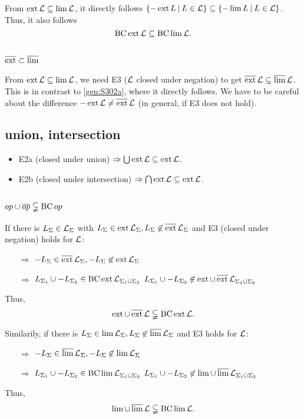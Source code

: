 From $\operatorname{ext} \mathcal{L} \subseteq \lim \mathcal{L}$, it directly follows $\Set{-\ext L}{L \in \Lang} \subseteq \Set{-\lim L}{L \in \Lang}$. Thus, it also follows
\[ \operatorname{BC} \operatorname{ext} \mathcal{L} \subseteq \operatorname{BC} \lim \mathcal{L} . \]

\subsection{$\operatorname{\overline{ext}} \subset \operatorname{\overline{lim}}$}

From $\operatorname{ext} \mathcal{L} \subseteq \lim \mathcal{L}$, we need E3 ($\mathcal{L}$ closed under negation) to get $\operatorname{\overline{ext}} \mathcal{L} \subseteq \operatorname{\overline{lim}} \mathcal{L}$. This is in contrast to \ref{gen:S302a}, where it directly follows. We have to be careful about the difference $- \operatorname{ext} \mathcal{L} \neq \operatorname{\overline{ext}} \mathcal{L}$ (in general, if E3 does not hold). 

\subsection{union, intersection}
\begin{itemize}
\item
E2a (closed under union) $\Rightarrow \bigcup \operatorname{ext} \mathcal{L} \subseteq \operatorname{ext} \mathcal{L}$.
\item
E2b (closed under intersection) $\Rightarrow \bigcap \operatorname{ext} \mathcal{L} \subseteq \operatorname{ext} \mathcal{L}$.
\end{itemize}

\subsection{$op \cup \overline{op} \subsetneqq \operatorname{BC} op$}
If there is $L_\Sigma \in \mathcal{L}_\Sigma$ with $L_\Sigma \in \operatorname{ext} \mathcal{L}_\Sigma, L_\Sigma \not\in \operatorname{\overline{ext}} \mathcal{L}_\Sigma$ and E3 (closed under negation) holds for $\mathcal{L}$:
\begin{itemize}
\item[$\Rightarrow$] $-L_\Sigma \in \operatorname{\overline{ext}} \mathcal{L}_\Sigma, -L_\Sigma \not\in \operatorname{ext} \mathcal{L}_\Sigma$
\item[$\Rightarrow$] $L_{\Sigma_1} \cup -L_{\Sigma_2} \in \operatorname{BC} \operatorname{ext} \mathcal{L}_{\Sigma_1 \dot{\cup} \Sigma_2}$ \newline
$L_{\Sigma_1} \cup -L_{\Sigma_2} \not\in \operatorname{ext} \cup \operatorname{\overline{ext}} \mathcal{L}_{\Sigma_1 \dot{\cup} \Sigma_2}$
\end{itemize}
Thus,
\[ \operatorname{ext} \cup \operatorname{\overline{ext}} \mathcal{L} \subsetneqq \operatorname{BC} \operatorname{ext} \mathcal{L} . \]

Similarily, if there is $L_\Sigma \in \lim \mathcal{L}_\Sigma, L_\Sigma \not\in \operatorname{\overline{lim}} \mathcal{L}_\Sigma$ and E3 holds for $\mathcal{L}$:
\begin{itemize}
\item[$\Rightarrow$] $-L_\Sigma \in \operatorname{\overline{lim}} \mathcal{L}_\Sigma, -L_\Sigma \not\in \lim \mathcal{L}_\Sigma$
\item[$\Rightarrow$] $L_{\Sigma_1} \cup -L_{\Sigma_2} \in \operatorname{BC} \lim \mathcal{L}_{\Sigma_1 \dot{\cup} \Sigma_2}$ \newline
$L_{\Sigma_1} \cup -L_{\Sigma_2} \not\in \lim \cup \operatorname{\overline{lim}} \mathcal{L}_{\Sigma_1 \dot{\cup} \Sigma_2}$
\end{itemize}
Thus,
\[ \lim \cup \operatorname{\overline{lim}} \mathcal{L} \subsetneqq \operatorname{BC} \lim \mathcal{L} . \]


